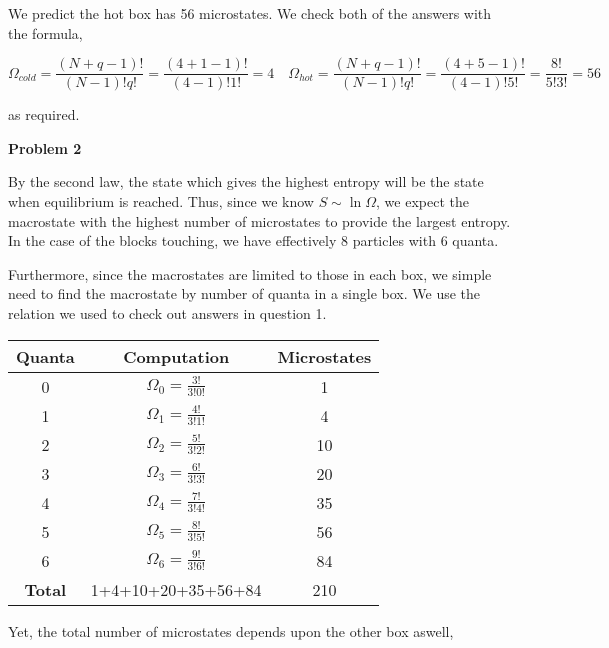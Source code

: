 \documentclass[10pt]{article}
\begin{document}
We predict the hot box has 56 microstates. We check both of the answers with the formula,

$$\Omega_{cold} = \frac{(N+q-1)!}{(N-1)!q!} = \frac{(4 + 1 - 1)!}{(4-1)!1!} = 4 \hspace{1em}
\Omega_{hot} = \frac{(N+q-1)!}{(N-1)!q!} = \frac{(4 + 5 - 1)!}{(4-1)!5!} = \frac{8!}{5!3!} = 56
$$

as required.

\newpage

\textbf{Problem 2}

By the second law, the state which gives the highest entropy will be the state when equilibrium is reached. Thus, since we know $S \sim \ln \Omega$, we expect the macrostate with the highest number of microstates to provide the largest entropy. In the case of the blocks touching, we have effectively 8 particles with 6 quanta.

Furthermore, since the macrostates are limited to those in each box, we simple need to find the macrostate by number of quanta in a single box. We use the relation we used to check out answers in question 1.

\begin{center}
\begin{tabular}{|c|c|c|}
 \hline
 \textbf{Quanta} & \textbf{Computation} & \textbf{Microstates}\\
 \hline
  0 & $\Omega_{0} =\frac{3!}{3!0!} $ &1\\
  \hline
  1 & $\Omega_{1} =\frac{4!}{3!1!} $ &4\\
  \hline
  2 & $\Omega_{2} =\frac{5!}{3!2!} $ &10\\  
  \hline
  3 & $\Omega_{3} =\frac{6!}{3!3!} $ &20\\
  \hline
  4 & $\Omega_{4} =\frac{7!}{3!4!} $ &35\\
  \hline
  5 & $\Omega_{5} =\frac{8!}{3!5!} $ &56\\
  \hline
  6 & $\Omega_{6} =\frac{9!}{3!6!} $ &84\\
  \hline
  \textbf{Total} & 1+4+10+20+35+56+84 & 210 \\
  \hline
\end{tabular}
\end{center}

Yet, the total number of microstates depends upon the other box aswell,
\end{document}
